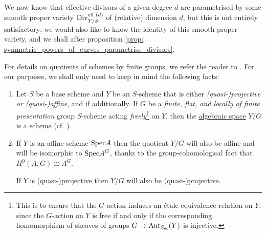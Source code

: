             We now know that effective divisors of a given degree $d$ are parametrised by some smooth proper variety $\mathrm{Div}_{Y/S}^{\mathrm{eff}, (d)}$ of (relative) dimension $d$, but this is not entirely satisfactory: we would also like to know the identity of this smooth proper variety, and we shall after proposition \ref{prop: symmetric_powers_of_curves_parametrise_divisors}.
            \begin{remark} \label{remark: quotients_of_schemes_by_finite_group_schemes}
                For details on quotients of schemes by finite groups, we refer the reader to \cite[Expos\'e V]{SGA1}. For our purposes, we shall only need to keep in mind the following facts: 
                    \begin{enumerate}
                        \item Let $S$ be a base scheme and $Y$ be an $S$-scheme that is either \textit{(quasi-)projective or (quasi-)affine}, and if additionally. If $G$ be a \textit{finite, flat, and locally of finite presentation} group $S$-scheme acting \textit{freely}\footnote{This is to ensure that the $G$-action induces an \'etale equivalence relation on $Y$, since the $G$-action on $Y$ is free if and only if the corresponding homomorphism of sheaves of groups $G \to \mathrm{Aut}_{S_{\mathrm{\acute{e}t}}}(Y)$ is injective.} on $Y$, then the \href{https://stacks.math.columbia.edu/tag/025X}{\underline{algebraic space}} $Y/G$ is a scheme (cf. \cite[\href{https://stacks.math.columbia.edu/tag/07S7}{Tag 07S7}]{stacks}). 
                        \item If $Y$ is an affine scheme $\mathrm{Spec} A$ then the quotient $Y/G$ will also be affine and will be isomorphic to $\mathrm{Spec} A^G$, thanks to the group-cohomological fact that $H^0(A, G) \cong A^G$. 
                        
                        If $Y$ is (quasi-)projective then $Y/G$ will also be (quasi-)projective.
                    \end{enumerate}
            \end{remark}
            

